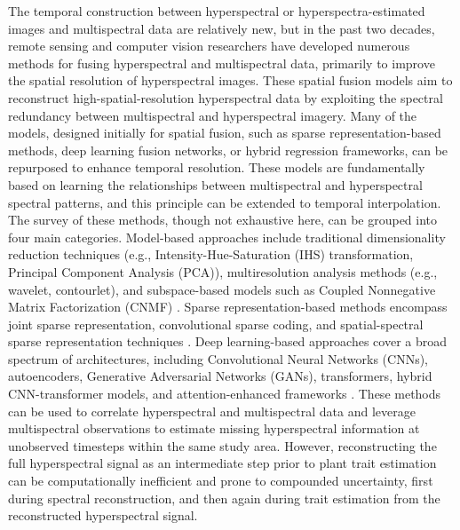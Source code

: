 \documentclass[pdflatex,sn-mathphys-num]{sn-jnl}%
\theoremstyle{thmstyleone}%
\theoremstyle{thmstyletwo}%
\theoremstyle{thmstylethree}%
\begin{document}
The temporal construction between hyperspectral or hyperspectra-estimated images and multispectral data are relatively new, but in the past two decades, remote sensing and computer vision researchers have developed numerous methods for fusing hyperspectral and multispectral data, primarily to improve the spatial resolution \cite{yokoya2017hyperspectral} of hyperspectral images. These spatial fusion models aim to reconstruct high-spatial-resolution hyperspectral data by exploiting the spectral redundancy between multispectral and hyperspectral imagery. Many of the models, designed initially for spatial fusion, such as sparse representation-based methods, deep learning fusion networks, or hybrid regression frameworks, can be repurposed to enhance temporal resolution. These models are fundamentally based on learning the relationships between multispectral and hyperspectral spectral patterns, and this principle can be extended to temporal interpolation. The survey of these methods, though not exhaustive here, can be grouped into four main categories. Model-based approaches include traditional dimensionality reduction techniques (e.g., Intensity-Hue-Saturation (IHS) transformation, Principal Component Analysis (PCA)), multiresolution analysis methods (e.g., wavelet, contourlet), and subspace-based models such as Coupled Nonnegative Matrix Factorization (CNMF) \cite{yokoya2017hyperspectral}. Sparse representation-based methods encompass joint sparse representation, convolutional sparse coding, and spatial-spectral sparse representation techniques \cite{xing2022fusion,dian2019multispectral}. Deep learning-based approaches cover a broad spectrum of architectures, including Convolutional Neural Networks (CNNs), autoencoders, Generative Adversarial Networks (GANs), transformers, hybrid CNN-transformer models, and attention-enhanced frameworks \cite{khader2022model,gao2023enhanced,jia2023multiscale,hong2021interpretable}. These methods can be used to correlate hyperspectral and multispectral data and leverage multispectral observations to estimate missing hyperspectral information at unobserved timesteps within the same study area. However, reconstructing the full hyperspectral signal as an intermediate step prior to plant trait estimation can be computationally inefficient and prone to compounded uncertainty, first during spectral reconstruction, and then again during trait estimation from the reconstructed hyperspectral signal.
\end{document}
